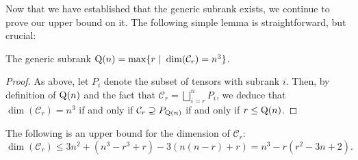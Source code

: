 \documentclass[10pt,a4paper]{article}
\theoremstyle{definition}
\theoremstyle{remark}
\newcommand{\gensubrank}{{\rm Q}}
\begin{document}
Now that we have established that the generic subrank exists, we continue to prove our upper bound on it.
The following simple lemma is straightforward, but crucial:
\begin{lemma} \label{lem:dimC-subrank}
The generic subrank $\gensubrank(n) = \max \{r\ |\ \dim(\mathcal{C}_r) = n^3\}$.
\end{lemma}

\begin{proof}
As above, let $P_i$ denote the subset of tensors with subrank $i$. Then, by definition of $\gensubrank(n)$ and the fact that $\mathcal{C}_r = \bigsqcup_{i =r}^n P_i$, we deduce that $\dim(\mathcal{C}_r) = n^3$ if and only if $\mathcal{C}_r \supseteq P_{\gensubrank(n)}$ if and only if $r \leq \gensubrank(n)$.
\end{proof}





\begin{proposition} \label{prop:dim-upper}
The following is an upper bound for the dimension of $\mathcal{C}_r$:
$$
\dim(\mathcal{C}_r) \leq 3n^2 + (n^3-r^3+r) - 3(n(n-r) + r) = n^3 - r(r^2-3n+2).
$$
\end{proposition}

%
\end{document}
